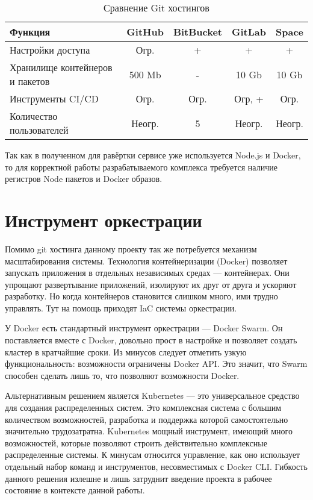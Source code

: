 \begin{center}
    \begin{longtable}{|p{}|c|c|c|c|}
        \caption{Сравнение Git хостингов}
        \label{tab:longtable}
        \hline
        Функция                             & GitHub          & BitBucket   & GitLab    & Space \\
        \hline
        Настройки доступа                   & Огр.            & +           & +         & +     \\
        Хранилище контейнеров и пакетов     & 500 Mb          & -           & 10 Gb     & 10 Gb \\
        Инструменты CI/CD                   & Огр.            & Огр.        & Огр, +    & Огр.  \\
        Количество пользователей            & Неогр.          & 5           & Неогр.    & Неогр.\\
        \hline
    \end{longtable}
\end{center}

Так как в полученном для равёртки сервисе уже используется Node.js и Docker, то для корректной работы разрабатываемого комплекса требуется наличие регистров Node пакетов и Docker образов.

\section{Инструмент оркестрации}

Помимо git хостинга данному проекту так же потребуется механизм масштабирования системы.
Технология контейнеризации (Docker) позволяет запускать приложения в отдельных независимых средах --- контейнерах.
Они упрощают развертывание приложений, изолируют их друг от друга и ускоряют разработку.
Но когда контейнеров становится слишком много, ими трудно управлять.
Тут на помощь приходят IaC системы оркестрации.

У Docker есть стандартный инструмент оркестрации --- Docker Swarm.
Он поставляется вместе с Docker, довольно прост в настройке и позволяет создать кластер в кратчайшие сроки.
Из минусов следует отметить узкую функциональность: возможности ограничены Docker API.
Это значит, что Swarm способен сделать лишь то, что позволяют возможности Docker.

Альтернативным решением является Kubernetes --- это универсальное средство для создания распределенных систем.
Это комплексная система с большим количеством возможностей, разработка и поддержка которой самостоятельно значительно трудозатратна.
Kubernetes мощный инструмент, имеющий много возможностей, которые позволяют строить действительно комплексные распределенные системы.
К минусам относится управление, как оно использует отдельный набор команд и инструментов, несовместимых с Docker CLI.
Гибкость данного решения излешне и лишь затруднит введение проекта в рабочее состояние в контексте данной работы.

